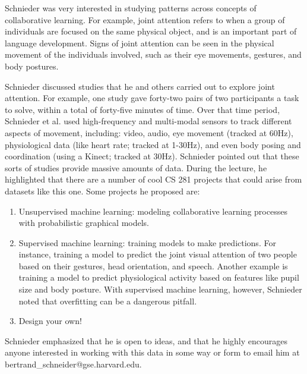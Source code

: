 \documentclass{article}
\begin{document}
Schnieder was very interested in studying patterns across concepts of collaborative learning. For example, joint attention refers to when a group of individuals are focused on the same physical object, and is an important part of language development. Signs of joint attention can be seen in the physical movement of the individuals involved, such as their eye movements, gestures, and body postures. 

Schnieder discussed studies that he and others carried out to explore joint attention. For example, one study gave forty-two pairs of two participants a task to solve, within a total of forty-five minutes of time. Over that time period, Schnieder et al. used high-frequency and multi-modal sensors to track different aspects of movement, including: video, audio, eye movement (tracked at 60Hz), physiological data (like heart rate; tracked at 1-30Hz), and even body posing and coordination (using a Kinect; tracked at 30Hz). Schnieder pointed out that these sorts of studies provide massive amounts of data. During the lecture, he highlighted that there are a number of cool CS 281 projects that could arise from datasets like this one. Some projects he proposed are:
\begin{enumerate}

\item Unsupervised machine learning: modeling collaborative learning processes with probabilistic graphical models.
\item Supervised machine learning: training models to make predictions. For instance, training a model to predict the joint visual attention of two people based on their gestures, head orientation, and speech. Another example is training a model to predict physiological activity based on features like pupil size and body posture. With supervised machine learning, however, Schnieder noted that overfitting can be a dangerous pitfall.
\item Design your own!

\end{enumerate}

Schnieder emphasized that he is open to ideas, and that he highly encourages anyone interested in working with this data in some way or form to email him at bertrand\_schneider@gse.harvard.edu.
\end{document}
